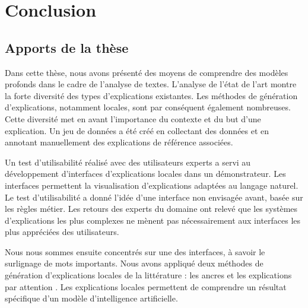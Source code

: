 \chapter*{Conclusion}

\section*{Apports de la thèse} %

Dans cette thèse, nous avons présenté des moyens de comprendre des modèles profonds dans le cadre de l'analyse de textes. L'analyse de l'état de l'art montre la forte diversité des types d'explications existantes. Les méthodes de génération d'explications, notamment locales, sont par conséquent également nombreuses. Cette diversité met en avant l'importance du contexte et du but d'une explication.
Un jeu de données a été créé en collectant des données et en annotant manuellement des explications de référence associées.

Un test d'utilisabilité réalisé avec des utilisateurs experts a servi au développement d'interfaces d'explications locales dans un démonstrateur. Les interfaces permettent la visualisation d'explications adaptées au langage naturel.
Le test d'utilisabilité a donné l'idée d'une interface non envisagée avant, basée sur les règles métier. Les retours des experts du domaine ont relevé que les systèmes d'explications les plus complexes ne mènent pas nécessairement aux interfaces les plus appréciées des utilisateurs.

Nous nous sommes ensuite concentrés sur une des interfaces, à savoir le surlignage de mots importants. Nous avons appliqué deux méthodes de génération d'explications locales de la littérature : les ancres \cite{Ribeiro2018} et les explications par attention \cite{Lin2017}. Les explications locales permettent de comprendre un résultat spécifique d'un modèle d'intelligence artificielle.


